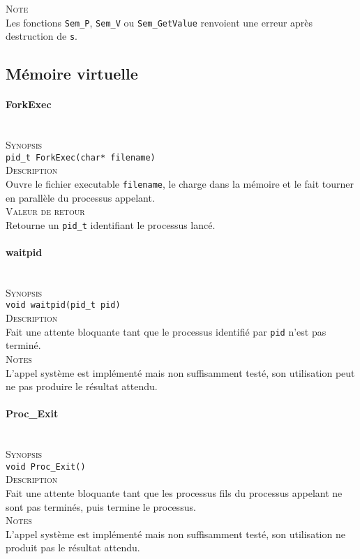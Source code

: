 \documentclass{report}
\newcommand{\myparagraph}[1]{\paragraph*{#1}\mbox{}\\}
\begin{document}
\textsc{Note}\\
	Les fonctions \texttt{Sem\_P}, \texttt{Sem\_V} ou \texttt{Sem\_GetValue} renvoient une erreur après destruction de \texttt{s}.\\
\newpage
\subsection*{Mémoire virtuelle}
\myparagraph{ForkExec}

\textsc{Synopsis}\\	
	\texttt{pid\_t ForkExec(char* filename)}\\
	
\textsc{Description}\\
	Ouvre le fichier executable \texttt{filename}, le charge dans la mémoire et le fait tourner en parallèle du processus appelant.\\
	
\textsc{Valeur de retour}\\
	Retourne un \texttt{pid\_t} identifiant le processus lancé.\\
	

\myparagraph{waitpid}

\textsc{Synopsis}\\	
	\texttt{void waitpid(pid\_t pid)}\\
	
\textsc{Description}\\
	Fait une attente bloquante tant que le processus identifié par \texttt{pid} n'est pas terminé.\\
	
\textsc{Notes}\\
	L'appel système est implémenté mais non suffisamment testé, son utilisation peut ne pas produire le résultat attendu.\\
	

\myparagraph{Proc\_Exit}

\textsc{Synopsis}\\	
	\texttt{void Proc\_Exit()}\\
	
\textsc{Description}\\
	Fait une attente bloquante tant que les processus fils du processus appelant ne sont pas terminés, puis termine le processus.\\
	
\textsc{Notes}\\
	L'appel système est implémenté mais non suffisamment testé, son utilisation ne produit pas le résultat attendu.\\
	
\end{document}
